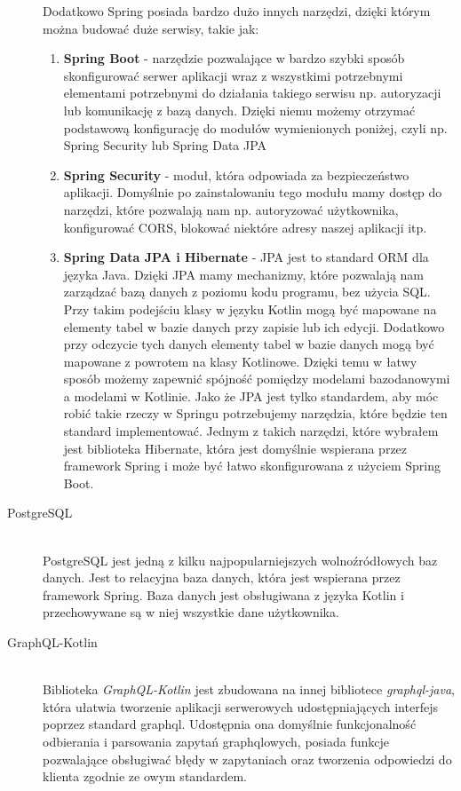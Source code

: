 \begin{description}
    Dodatkowo Spring posiada bardzo dużo innych narzędzi, dzięki którym można budować duże serwisy, takie jak:
    \begin{enumerate}
      \item \textbf{Spring Boot} - narzędzie pozwalające w bardzo szybki sposób skonfigurować serwer aplikacji wraz z wszystkimi potrzebnymi elementami potrzebnymi do działania takiego serwisu np. autoryzacji lub komunikację z bazą danych. Dzięki niemu możemy otrzymać podstawową konfigurację do modułów wymienionych poniżej, czyli np. Spring Security lub Spring Data JPA
      \item \textbf{Spring Security} - moduł, która odpowiada za bezpieczeństwo aplikacji. Domyślnie po zainstalowaniu tego modułu mamy dostęp do narzędzi, które pozwalają nam np. autoryzować użytkownika, konfigurować CORS, blokować niektóre adresy naszej aplikacji itp.
      \item \textbf{Spring Data JPA i Hibernate} - JPA jest to standard ORM dla języka Java. Dzięki JPA mamy mechanizmy, które pozwalają nam zarządzać bazą danych z poziomu kodu programu, bez użycia SQL. Przy takim podejściu klasy w języku Kotlin mogą być mapowane na elementy tabel w bazie danych przy zapisie lub ich edycji. Dodatkowo przy odczycie tych danych elementy tabel w bazie danych mogą być mapowane z powrotem na klasy Kotlinowe. Dzięki temu w łatwy sposób możemy zapewnić spójność pomiędzy modelami bazodanowymi a modelami w Kotlinie. Jako że JPA jest tylko standardem, aby móc robić takie rzeczy w Springu potrzebujemy narzędzia, które będzie ten standard implementować. Jednym z takich narzędzi, które wybrałem jest biblioteka Hibernate, która jest domyślnie wspierana przez framework Spring i może być łatwo skonfigurowana z użyciem Spring Boot.
    \end{enumerate}

  \item[PostgreSQL] \hfill \\ PostgreSQL jest jedną z kilku najpopularniejszych wolnoźródłowych baz danych. Jest to relacyjna baza danych, która jest wspierana przez framework Spring. Baza danych jest obsługiwana z języka Kotlin i przechowywane są w niej wszystkie dane użytkownika.
  \item[GraphQL-Kotlin] \hfill \\ Biblioteka \emph{GraphQL-Kotlin} jest zbudowana na innej bibliotece \emph{graphql-java}, która ułatwia tworzenie aplikacji serwerowych udostępniających interfejs poprzez standard graphql. Udostępnia ona domyślnie funkcjonalność odbierania i parsowania zapytań graphqlowych, posiada funkcje pozwalające obsługiwać błędy w zapytaniach oraz tworzenia odpowiedzi do klienta zgodnie ze owym standardem.
\end{description}


